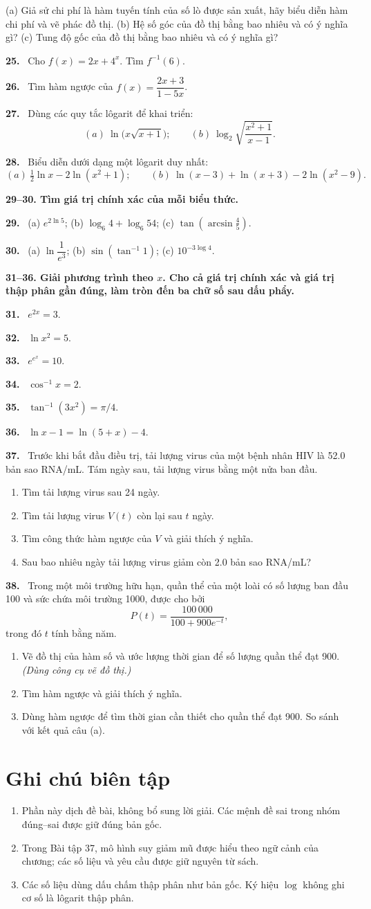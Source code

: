 \documentclass[12pt,a4paper]{article}
\newcommand{\bt}[1]{\par\smallskip\noindent\textbf{#1.}\ }
\newcommand{\group}[1]{\par\medskip\noindent\textbf{#1}\par}
\begin{document}
(a) Giả sử chi phí là hàm tuyến tính của số lò được sản xuất, hãy biểu diễn hàm chi phí và vẽ phác đồ thị. (b) Hệ số góc của đồ thị bằng bao nhiêu và có ý nghĩa gì? (c) Tung độ gốc của đồ thị bằng bao nhiêu và có ý nghĩa gì?
\bt{25} Cho $f(x)=2x+4^x$. Tìm $f^{-1}(6)$.
\bt{26} Tìm hàm ngược của $f(x)=\dfrac{2x+3}{1-5x}$.
\bt{27} Dùng các quy tắc lôgarit để khai triển:
\[(a)\ \ln\bigl(x\sqrt{x+1}\bigr);\qquad(b)\ \log_2\sqrt{\frac{x^2+1}{x-1}}.\]
\bt{28} Biểu diễn dưới dạng một lôgarit duy nhất:
\[(a)\ \tfrac12\ln x-2\ln(x^2+1);\qquad(b)\ \ln(x-3)+\ln(x+3)-2\ln(x^2-9).\]
\group{29–30. Tìm giá trị chính xác của mỗi biểu thức.}
\bt{29} (a) $e^{2\ln5}$; \quad(b) $\log_6 4+\log_6 54$; \quad(c) $\tan(\arcsin\tfrac45)$.
\bt{30} (a) $\ln\dfrac1{e^3}$; \quad(b) $\sin(\tan^{-1}1)$; \quad(c) $10^{-3\log4}$.
\group{31–36. Giải phương trình theo $x$. Cho cả giá trị chính xác và giá trị thập phân gần đúng, làm tròn đến ba chữ số sau dấu phẩy.}
\bt{31} $e^{2x}=3$.
\bt{32} $\ln x^2=5$.
\bt{33} $e^{e^x}=10$.
\bt{34} $\cos^{-1}x=2$.
\bt{35} $\tan^{-1}(3x^2)=\pi/4$.
\bt{36} $\ln x-1=\ln(5+x)-4$.
\bt{37} Trước khi bắt đầu điều trị, tải lượng virus của một bệnh nhân HIV là 52.0 bản sao RNA/mL. Tám ngày sau, tải lượng virus bằng một nửa ban đầu.
\begin{enumerate}[label=(\alph*)]
\item Tìm tải lượng virus sau 24 ngày.
\item Tìm tải lượng virus $V(t)$ còn lại sau $t$ ngày.
\item Tìm công thức hàm ngược của $V$ và giải thích ý nghĩa.
\item Sau bao nhiêu ngày tải lượng virus giảm còn 2.0 bản sao RNA/mL?
\end{enumerate}
\bt{38} Trong một môi trường hữu hạn, quần thể của một loài có số lượng ban đầu 100 và sức chứa môi trường 1000, được cho bởi
\[P(t)=\frac{100\,000}{100+900e^{-t}},\]
trong đó $t$ tính bằng năm.
\begin{enumerate}[label=(\alph*)]
\item Vẽ đồ thị của hàm số và ước lượng thời gian để số lượng quần thể đạt 900. \textit{(Dùng công cụ vẽ đồ thị.)}
\item Tìm hàm ngược và giải thích ý nghĩa.
\item Dùng hàm ngược để tìm thời gian cần thiết cho quần thể đạt 900. So sánh với kết quả câu (a).
\end{enumerate}
\section*{Ghi chú biên tập}
\begin{enumerate}
\item Phần này dịch đề bài, không bổ sung lời giải. Các mệnh đề sai trong nhóm đúng–sai được giữ đúng bản gốc.
\item Trong Bài tập 37, mô hình suy giảm mũ được hiểu theo ngữ cảnh của chương; các số liệu và yêu cầu được giữ nguyên từ sách.
\item Các số liệu dùng dấu chấm thập phân như bản gốc. Ký hiệu $\log$ không ghi cơ số là lôgarit thập phân.
\end{enumerate}
\end{document}
